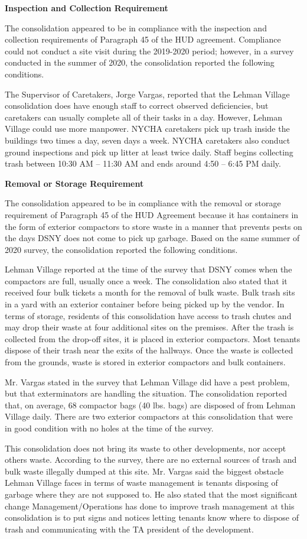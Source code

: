

\textbf{Inspection and Collection Requirement}

The consolidation appeared to be in compliance with the inspection and collection requirements of Paragraph 45 of the HUD agreement. Compliance could not conduct a site visit during the 2019-2020 period; however, in a survey conducted in the summer of 2020, the consolidation reported the following conditions.

The Supervisor of Caretakers, Jorge Vargas, reported that the Lehman Village consolidation does have enough staff to correct observed deficiencies, but caretakers can usually complete all of their tasks in a day. However, Lehman Village could use more manpower. NYCHA caretakers pick up trash inside the buildings two times a day, seven days a week. NYCHA caretakers also conduct ground inspections and pick up litter at least twice daily. Staff begins collecting trash between 10:30 AM -- 11:30 AM and ends around 4:50 -- 6:45 PM daily. 

\textbf{Removal or Storage Requirement}

The consolidation appeared to be in compliance with the removal or storage requirement of Paragraph  45 of the HUD Agreement because it has containers in the form of exterior compactors to store waste in a manner that prevents pests on the days DSNY does not come to pick up garbage. Based on the same summer of  2020 survey, the consolidation reported the following conditions.

Lehman Village reported at the time of the survey that DSNY comes when the compactors are full, usually once a week. The consolidation also stated that it received four bulk tickets a month for the removal of bulk waste. Bulk trash sits in a yard with an exterior container before being picked up by the vendor. In terms of storage, residents of this consolidation have access to trash chutes and may drop their waste at four additional sites on the premises. After the trash is collected from the drop-off sites, it is placed in exterior compactors. Most tenants dispose of their trash near the exits of the hallways. Once the waste is collected from the grounds, waste is stored in exterior compactors and bulk containers.  

Mr. Vargas stated in the survey that Lehman Village did have a pest problem, but that exterminators are handling the situation. The consolidation reported that, on average, 68 compactor bags (40 lbs. bags) are disposed of from Lehman Village daily. There are two exterior compactors at this consolidation that were in good condition with no holes at the time of the survey. 

This consolidation does not bring its waste to other developments, nor accept others waste. According to the survey, there are no external sources of trash and bulk waste illegally dumped at this site. Mr. Vargas said the biggest obstacle Lehman Village faces in terms of waste management is tenants disposing of garbage where they are not supposed to. He also stated that the most significant change Management/Operations has done to improve trash management at this consolidation is to put signs and notices letting tenants know where to dispose of trash and communicating with the TA president of the development.